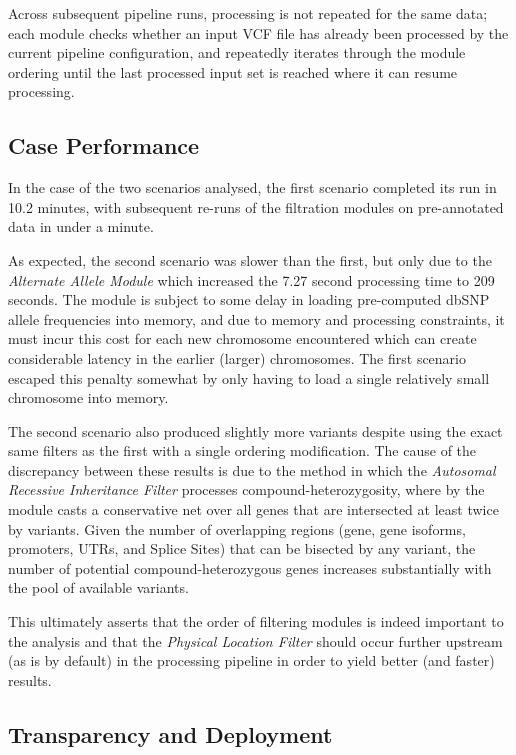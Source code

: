 \documentclass[twocolumn]{bmcart}%
\begin{document}
Across subsequent pipeline runs, processing is not repeated for the same data; each module checks whether an input VCF file has already been processed by the current pipeline configuration, and repeatedly iterates through the module ordering until the last processed input set is reached where it can resume processing.


\subsection{Case Performance}

In the case of the two scenarios analysed, the first scenario completed its run in 10.2 minutes, with subsequent re-runs of the filtration modules on pre-annotated data in under a minute. 

As expected, the second scenario was slower than the first, but only due to the \textit{Alternate Allele Module} which increased the 7.27 second processing time to 209 seconds. The module is subject to some delay in loading pre-computed dbSNP allele frequencies into memory, and due to memory and processing constraints, it must incur this cost for each new chromosome encountered which can create considerable latency in the earlier (larger) chromosomes. The first scenario escaped this penalty somewhat by only having to load a single relatively small chromosome into memory.

The second scenario also produced slightly more variants despite using the exact same filters as the first with a single ordering modification. The cause of the discrepancy between these results is due to the method in which the \textit{Autosomal Recessive Inheritance Filter} processes compound-heterozygosity, where by the module casts a conservative net over all genes that are intersected at least twice by variants. Given the number of overlapping regions (gene, gene isoforms, promoters, UTRs, and Splice Sites) that can be bisected by any variant, the number of potential compound-heterozygous genes increases substantially with the pool of available variants.

This ultimately asserts that the order of filtering modules is indeed important to the analysis and that the \textit{Physical Location Filter} should occur further upstream (as is by default) in the processing pipeline in order to yield better (and faster) results.



\subsection{Transparency and Deployment}
\end{document}
